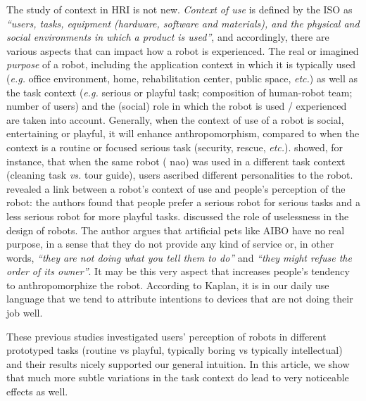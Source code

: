 \documentclass[lettersize, apacite, twoside, HRI]{apa_HRI}
\newcommand{\eg}{\textit{e.g.}\xspace}
\newcommand{\etc}{\textit{etc.}\xspace}
\newcommand{\vs}{\textit{vs.}\xspace}
\begin{document}
The study of context in HRI is not new. \textit{Context of use} is defined by
the ISO as \textit{``users, tasks, equipment (hardware, software and materials),
and the physical and social environments in which a product is used''}, and
accordingly, there are various aspects that can impact how a robot is
experienced. The real or imagined \textit{purpose} of a robot, including the
application context in which it is typically used (\eg office environment, home,
rehabilitation center, public space, \etc) as well as the task context (\eg
serious or playful task; composition of human-robot team; number of users) and
the (social) role in which the robot is used / experienced are taken into
account. Generally, when the context of use of a robot is social, entertaining
or playful, it will enhance anthropomorphism, compared to when the context is a
routine or focused serious task (security, rescue, \etc).
\cite{joosse_what_2013} showed, for instance, that when the same robot ({\sc
nao}) was used in a different task context (cleaning task \vs tour guide), users
ascribed different personalities to the robot. \cite{goetz_cooperation_2002}
revealed a link between a robot's context of use and people's perception of the
robot: the authors found that people prefer a serious robot for serious tasks
and a less serious robot for more playful tasks. \cite{kaplan_free_2000}
discussed the role of uselessness in the design of robots. The author argues
that artificial pets like AIBO have no real purpose, in a sense that they do not
provide any kind of service or, in other words, \textit{``they are not doing
what you tell them to do''} and \textit{``they might refuse the order of its
owner''}. It may be this very aspect that increases people's tendency to
anthropomorphize the robot. According to Kaplan, it is in our daily use language
that we tend to attribute intentions to devices that are not doing their job
well.

These previous studies investigated users' perception of robots in
different prototyped tasks (routine vs playful, typically boring vs typically
intellectual) and their results nicely supported our general intuition.
In this article, we show that much more subtle variations in the task context do
lead to very noticeable effects as well.
\end{document}
